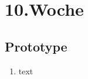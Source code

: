 \chapter{10.\hspace{0.5em}Woche}\label{wo10}

\section{Prototype}\label{wo10_1}

\begin{enumerate}[label={\Roman*)}]
	\item text
\end{enumerate}